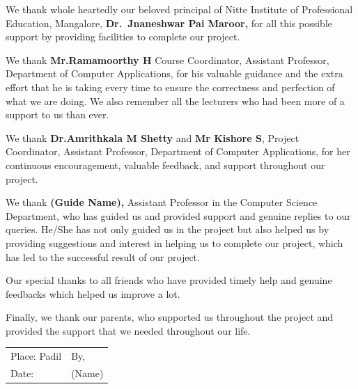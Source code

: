 \documentclass[12pt, a4paper]{report}
\begin{document}
We thank whole heartedly our beloved principal of Nitte Institute of Professional Education, Mangalore, \textbf{Dr.\ Jnaneshwar Pai Maroor,} for all this possible support by providing facilities to complete our project.

We thank \textbf{Mr.Ramamoorthy H } Course Coordinator, Assistant Professor, Department of Computer Applications, for his valuable guidance and the extra effort that he is taking every time to ensure the correctness and perfection of what we are doing. We also remember all the lecturers who had been more of a support to us than ever.

We thank \textbf{Dr.Amrithkala M Shetty} and \textbf{Mr Kishore S}, Project Coordinator, Assistant Professor, Department of Computer Applications, for her continuous encouragement, valuable feedback, and support throughout our project.

We thank \textbf{(Guide Name),} Assistant Professor in the Computer Science Department, who has guided us and provided support and genuine replies to our queries. He/She has not only guided us in the project but also helped us by providing suggestions and interest in helping us to complete our project, which has led to the successful result of our project.

Our special thanks to all friends who have provided timely help and genuine feedbacks which helped us improve a lot.

Finally, we thank our parents, who supported us throughout the project and provided the support that we needed throughout our life.

\vspace{30pt}
\noindent
\begin{tabular}{@{}p{}p{}@{}}
  Place: Padil & By, \\[8pt]
  Date: & (Name) \\
\end{tabular}

\clearpage
\renewcommand{\contentsname}{INDEX}
\tableofcontents

\clearpage
\listoffigures
{}

\clearpage
\listoftables
{}
\end{document}
